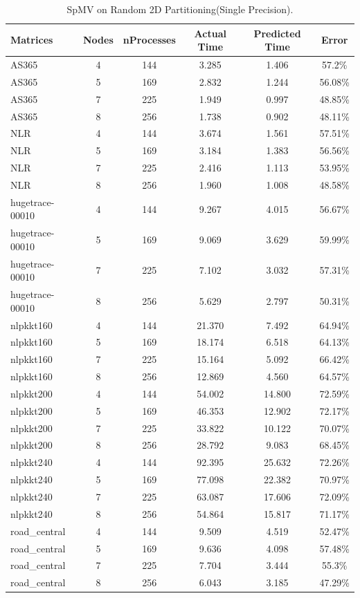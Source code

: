 \documentclass[conference, 10ppt]{IEEEtran}
\begin{document}
\begin{table}[htb]
\caption{SpMV on Random 2D Partitioning(Single Precision).}
\label{tab:spmv-2d-single}
\centering
\begin{tabular}[c]{| l | c | c | c | c | c |}
\hline
Matrices & Nodes & nProcesses & Actual Time & Predicted Time & Error \\ \hline

AS365 & 4 & 144 & 3.285 & 1.406 & 57.2\% \\ \hline
AS365 & 5 & 169 & 2.832 & 1.244 & 56.08\% \\ \hline
AS365 & 7 & 225 & 1.949 & 0.997 & 48.85\% \\ \hline
AS365 & 8 & 256 & 1.738 & 0.902 & 48.11\% \\ \hline
NLR & 4 & 144 & 3.674 & 1.561 & 57.51\% \\ \hline
NLR & 5 & 169 & 3.184 & 1.383 & 56.56\% \\ \hline
NLR & 7 & 225 & 2.416 & 1.113 & 53.95\% \\ \hline
NLR & 8 & 256 & 1.960 & 1.008 & 48.58\% \\ \hline
hugetrace-00010 & 4 & 144 & 9.267 & 4.015 & 56.67\% \\ \hline
hugetrace-00010 & 5 & 169 & 9.069 & 3.629 & 59.99\% \\ \hline
hugetrace-00010 & 7 & 225 & 7.102 & 3.032 & 57.31\% \\ \hline
hugetrace-00010 & 8 & 256 & 5.629 & 2.797 & 50.31\% \\ \hline
nlpkkt160 & 4 & 144 & 21.370 & 7.492 & 64.94\% \\ \hline
nlpkkt160 & 5 & 169 & 18.174 & 6.518 & 64.13\% \\ \hline
nlpkkt160 & 7 & 225 & 15.164 & 5.092 & 66.42\% \\ \hline
nlpkkt160 & 8 & 256 & 12.869 & 4.560 & 64.57\% \\ \hline
nlpkkt200 & 4 & 144 & 54.002 & 14.800 & 72.59\% \\ \hline
nlpkkt200 & 5 & 169 & 46.353 & 12.902 & 72.17\% \\ \hline
nlpkkt200 & 7 & 225 & 33.822 & 10.122 & 70.07\% \\ \hline
nlpkkt200 & 8 & 256 & 28.792 & 9.083 & 68.45\% \\ \hline
nlpkkt240 & 4 & 144 & 92.395 & 25.632 & 72.26\% \\ \hline
nlpkkt240 & 5 & 169 & 77.098 & 22.382 & 70.97\% \\ \hline
nlpkkt240 & 7 & 225 & 63.087 & 17.606 & 72.09\% \\ \hline
nlpkkt240 & 8 & 256 & 54.864 & 15.817 & 71.17\% \\ \hline
road\_central & 4 & 144 & 9.509 & 4.519 & 52.47\% \\ \hline
road\_central & 5 & 169 & 9.636 & 4.098 & 57.48\% \\ \hline
road\_central & 7 & 225 & 7.704 & 3.444 & 55.3\% \\ \hline
road\_central & 8 & 256 & 6.043 & 3.185 & 47.29\% \\ \hline


\end{tabular}
\end{table}
\end{document}
